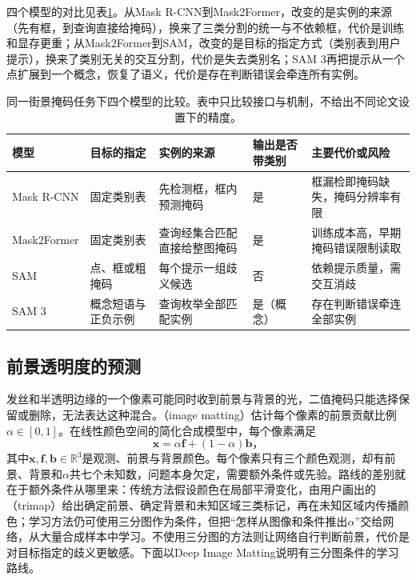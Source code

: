 四个模型的对比见表\ref{tab:vision-recognition-mask-compare}。从Mask R-CNN到Mask2Former，改变的是实例的来源（先有框，到查询直接给掩码），换来了三类分割的统一与不依赖框，代价是训练和显存更重；从Mask2Former到SAM，改变的是目标的指定方式（类别表到用户提示），换来了类别无关的交互分割，代价是失去类别名；SAM 3再把提示从一个点扩展到一个概念，恢复了语义，代价是存在判断错误会牵连所有实例。

\begin{table}[tbp]
 \centering
 \small
 \begin{tabularx}{\linewidth}{@{}lXXXX@{}}
 \toprule
 模型 & 目标的指定 & 实例的来源 & 输出是否带类别 & 主要代价或风险\\
 \midrule
 Mask R-CNN & 固定类别表 & 先检测框，框内预测掩码 & 是 & 框漏检即掩码缺失，掩码分辨率有限\\
 Mask2Former & 固定类别表 & 查询经集合匹配直接给整图掩码 & 是 & 训练成本高，早期掩码错误限制读取\\
 SAM & 点、框或粗掩码 & 每个提示一组歧义候选 & 否 & 依赖提示质量，需交互消歧\\
 SAM 3 & 概念短语与正负示例 & 查询枚举全部匹配实例 & 是（概念） & 存在判断错误牵连全部实例\\
 \bottomrule
 \end{tabularx}
 \caption{同一街景掩码任务下四个模型的比较。表中只比较接口与机制，不给出不同论文设置下的精度。}
 \label{tab:vision-recognition-mask-compare}
\end{table}

\subsection{前景透明度的预测}
\label{sec:vision-recognition-matting}

发丝和半透明边缘的一个像素可能同时收到前景与背景的光，二值掩码只能选择保留或删除，无法表达这种混合。（image matting）估计每个像素的前景贡献比例$\alpha\in[0,1]$。在线性颜色空间的简化合成模型中，每个像素满足
\begin{equation}
 \bm{x}=\alpha\bm{f}+(1-\alpha)\bm{b}\text{，}
 \label{eq:vision-matting}
\end{equation}
其中$\bm{x},\bm{f},\bm{b}\in\mathbb{R}^3$是观测、前景与背景颜色。每个像素只有三个颜色观测，却有前景、背景和$\alpha$共七个未知数，问题本身欠定，需要额外条件或先验。路线的差别就在于额外条件从哪里来：传统方法假设颜色在局部平滑变化，由用户画出的（trimap）给出确定前景、确定背景和未知区域三类标记，再在未知区域内传播颜色；学习方法仍可使用三分图作为条件，但把“怎样从图像和条件推出$\alpha$”交给网络，从大量合成样本中学习。不使用三分图的方法则让网络自行判断前景，代价是对目标指定的歧义更敏感。下面以Deep Image Matting说明有三分图条件的学习路线。

